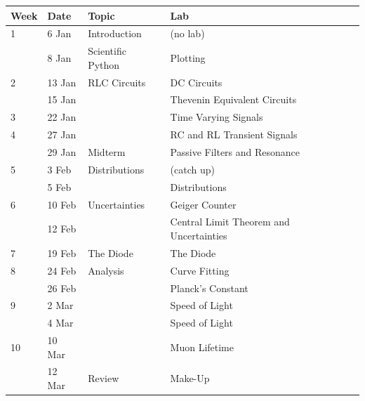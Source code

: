 \documentclass[12pt]{article}
\begin{document}
\begin{table}[h!]
\normalsize %
\begin{tabular}{ lllll }
\hline
\textbf{Week} & \textbf{Date} & \textbf{Topic} & \textbf{Lab} \\
\hline
1 & 6 Jan & Introduction & (no lab) \\
   & 8 Jan & Scientific Python & Plotting\\
\hline
2 & 13 Jan & RLC Circuits & DC Circuits \\
  & 15 Jan & & Thevenin Equivalent Circuits \\
\hline
3 & 22 Jan & & Time Varying Signals \\
\hline
4 & 27 Jan & & RC and RL Transient Signals \\
  & 29 Jan & Midterm &  Passive Filters and Resonance \\
\hline
5 & 3 Feb & Distributions & (catch up) \\
  & 5 Feb & & Distributions \\
\hline
6 & 10 Feb & Uncertainties & Geiger Counter \\
  & 12 Feb & & Central Limit Theorem and Uncertainties \\
\hline
7 & 19 Feb & The Diode & The Diode\\
\hline
8 & 24 Feb & Analysis & Curve Fitting \\
  & 26 Feb & & Planck's Constant \\
\hline
9 & 2 Mar & & Speed of Light \\
  & 4 Mar & & Speed of Light \\
\hline
10 & 10 Mar &  & Muon Lifetime\\
   & 12 Mar & Review & Make-Up \\
\hline
\end{tabular} 
\end{table}
\end{document}
